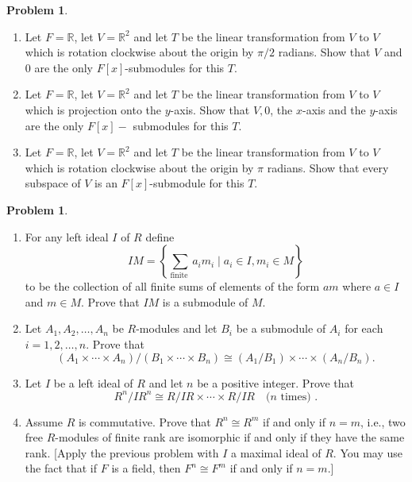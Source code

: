 \documentclass{amsart}
\numberwithin{equation}{section}
\theoremstyle{definition}
\newtheorem{problem}[thm]{Problem}
\begin{document}


\begin{problem}
  \begin{enumerate}
  \item Let \(F=\mathbb{R}\), let \(V=\mathbb{R}^2\) and let \(T\) be the linear transformation from \(V\) to \(V\) which is rotation clockwise about the origin by \(\pi / 2\) radians. Show that \(V\) and 0 are the only \(F[x]\)-submodules for this \(T\).
  \item Let \(F=\mathbb{R}\), let \(V=\mathbb{R}^2\) and let \(T\) be the linear transformation from \(V\) to \(V\) which is projection onto the \(y\)-axis. Show that \(V, 0\), the \(x\)-axis and the \(y\)-axis are the only \(F[x]-\) submodules for this \(T\).
  \item Let \(F=\mathbb{R}\), let \(V=\mathbb{R}^2\) and let \(T\) be the linear transformation from \(V\) to \(V\) which is rotation clockwise about the origin by \(\pi\) radians. Show that every subspace of \(V\) is an
\(F[x]\)-submodule for this \(T\).
  \end{enumerate}
\end{problem}



\begin{problem}
  \begin{enumerate}
    \item For any left ideal \(I\) of \(R\) define
\[
I M=\left\{\sum_{\text {finite }} a_i m_i \mid a_i \in I, m_i \in M\right\}
\]
to be the collection of all finite sums of elements of the form \(a m\) where \(a \in I\) and \(m \in M\). Prove that \(I M\) is a submodule of \(M\).
  \item Let \(A_1, A_2, \ldots, A_n\) be \(R\)-modules and let \(B_i\) be a submodule of \(A_i\) for each \(i=1,2, \ldots, n\). Prove that
\[
\left(A_1 \times \cdots \times A_n\right) /\left(B_1 \times \cdots \times B_n\right) \cong\left(A_1 / B_1\right) \times \cdots \times\left(A_n / B_n\right) .
\]
\item Let \(I\) be a left ideal of \(R\) and let \(n\) be a positive integer. Prove that
\[
R^n / I R^n \cong R / I R \times \cdots \times R / I R \quad(n \text { times) }.
\]
\item   Assume \(R\) is commutative. Prove that \(R^n \cong R^m\) if and
  only if \(n=m\), i.e., two free \(R\)-modules of finite rank are
  isomorphic if and only if they have the same rank. [Apply the
  previous problem with \(I\) a maximal ideal of \(R\). You may use
  the fact that if \(F\) is a field, then \(F^n \cong F^m\) if and
  only if \(n=m\).]
  \end{enumerate}
\end{problem}
\end{document}
